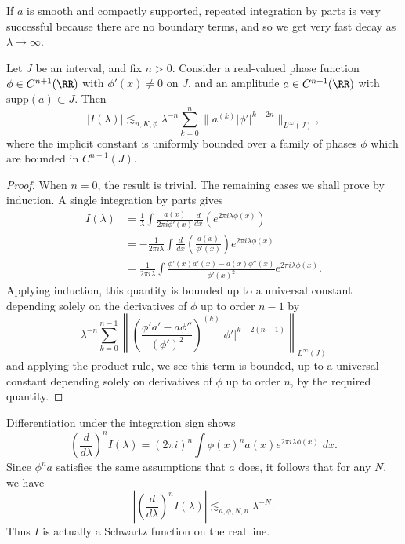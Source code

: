 If $a$ is smooth and compactly supported, repeated integration by parts is very successful because there are no boundary terms, and so we get very fast decay as $\lambda \to \infty$.

\begin{theorem}
    Let $J$ be an interval, and fix $n > 0$. Consider a real-valued phase function $\phi \in C^{n+1}(\RR)$ with $\phi'(x) \neq 0$ on $J$, and an amplitude $a \in C^{n+1}(\RR)$ with $\text{supp}(a) \subset J$. Then
    \[ |I(\lambda)| \lesssim_{n,K,\phi} \lambda^{-n} \sum_{k = 0}^n \| a^{(k)} |\phi'|^{k - 2n} \|_{L^\infty(J)}, \]
    where the implicit constant is uniformly bounded over a family of phases $\phi$ which are bounded in $C^{n+1}(J)$.
\end{theorem}
\begin{proof}
  When $n = 0$, the result is trivial. The remaining cases we shall prove by induction. A single integration by parts gives
  \begin{align*} I(\lambda) &= \frac{1}{\lambda} \int \frac{a(x)}{2 \pi i \phi'(x)} \frac{d}{dx} \left( e^{2 \pi i \lambda \phi(x)} \right)\\
  &= - \frac{1}{2 \pi i \lambda} \int \frac{d}{dx} \left( \frac{a(x)}{\phi'(x)} \right) e^{2 \pi i \lambda \phi(x)}\\
  &= \frac{1}{2 \pi i \lambda} \int \frac{\phi'(x) a'(x) - a(x) \phi''(x)}{\phi'(x)^2} e^{2 \pi i \lambda \phi(x)}.
  \end{align*}
  Applying induction, this quantity is bounded up to a universal constant depending solely on the derivatives of $\phi$ up to order $n-1$ by
  \[ \lambda^{-n} \sum_{k = 0}^{n-1} \left\| \left( \frac{\phi' a' - a \phi''}{(\phi')^2} \right)^{(k)} |\phi'|^{k - 2(n-1)} \right\|_{L^\infty(J)} \]
  and applying the product rule, we see this term is bounded, up to a universal constant depending solely on derivatives of $\phi$ up to order $n$, by the required quantity.
\end{proof}

\begin{remark}
    Differentiation under the integration sign shows
    \[ \left( \frac{d}{d\lambda} \right)^n I (\lambda) = (2 \pi i)^n \int \phi(x)^n a(x) e^{2 \pi i \lambda \phi(x)}\; dx. \]
    Since $\phi^n a$ satisfies the same assumptions that $a$ does, it follows that for any $N$, we have
    \[ \left| \left( \frac{d}{d\lambda} \right)^n I (\lambda) \right| \lesssim_{a,\phi,N,n} \lambda^{-N}. \]
    Thus $I$ is actually a Schwartz function on the real line. %
\end{remark}

